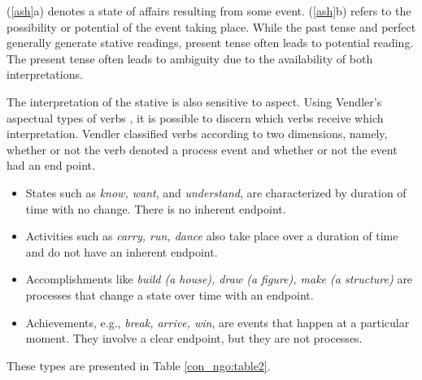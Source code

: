 \documentclass[output=paper]{langscibook}
\begin{document}
\begin{exe}
\ex\label{ash}{
\begin{xlist}
\end{xlist}
}
\end{exe}
(\ref{ash}a) denotes a state of affairs resulting from some event. (\ref{ash}b) refers to the possibility or potential of the event taking place. While the past tense and perfect generally generate stative readings, present tense often leads to potential reading. The present tense often leads to ambiguity due to the availability of both interpretations. 

The interpretation of the stative is also sensitive to aspect. Using Vendler's aspectual types of verbs \citep{vendler67}, it is possible to discern which verbs receive which interpretation. Vendler classified verbs according to two dimensions, namely, whether or not the verb denoted a process event and whether or not the event had an end point.

\begin{itemize}
    \item States such as \textit{know, want}, and \textit{understand}, are characterized by duration of time with no change. There is no inherent endpoint. 
\item Activities such as \textit{carry, run, dance} also take place over a duration of time and do not have an inherent endpoint.
\item Accomplishments like \textit{build (a house), draw (a figure), make (a structure)} are processes that change a state over time with an endpoint. 
\item Achievements, e.g., \textit{break, arrive, win}, are events that happen at a particular moment. They involve a clear endpoint, but they are not processes.
\end{itemize}
These types are presented in Table \ref{con_ngo:table2}. 

\begin{table} 
    \caption{Aspectual types of verbs (based on Vendler 1967)\label{con_ngo:table2}}
\end{table}
\end{document}
